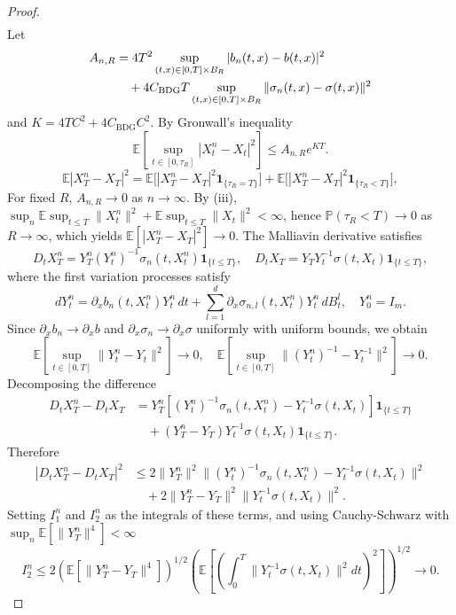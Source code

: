 \documentclass[10pt,a4paper]{amsart}
\begin{document}
\begin{proof}
\begin{align*}
\end{align*}
%
Let 
\begin{align}
A_{n,R} &= 4T^2 \sup_{(t,x) \in [0,T] \times B_R} |b_n(t, x) - b(t, x)|^2 \notag\\
&\quad + 4C_{\mathrm{BDG}}T \sup_{(t,x) \in [0,T] \times B_R} \|\sigma_n(t, x) - \sigma(t, x)\|^2
\end{align}
and $K = 4TC^2 + 4C_{\mathrm{BDG}}C^2$. By Gronwall's inequality
\[
\mathbb{E}\left[\sup_{t \in [0,\tau_R]} |X_t^n - X_t|^2\right] \leq A_{n,R} e^{KT}.
\]
\[
\mathbb{E}|X_T^n-X_T|^2 
= \mathbb{E}\big[|X_T^n-X_T|^2\mathbf{1}_{\{\tau_R=T\}}\big]
  + \mathbb{E}\big[|X_T^n-X_T|^2\mathbf{1}_{\{\tau_R<T\}}\big],
\]
For fixed \(R\), \(A_{n,R} \to 0\) as \(n \to \infty\). By (iii), \(\sup_n \mathbb{E}\sup_{t\le T}\|X_t^n\|^2 + \mathbb{E}\sup_{t\le T}\|X_t\|^2 < \infty\), hence \(\mathbb{P}(\tau_R<T)\to0\) as \(R\to\infty\), which yields \(\mathbb{E}[|X_T^n-X_T|^2]\to0\).
%
The Malliavin derivative satisfies
\[
D_t X_T^n = Y_T^n (Y_t^n)^{-1} \sigma_n(t, X_t^n) \mathbf{1}_{\{t \leq T\}}, \quad D_t X_T = Y_T Y_t^{-1} \sigma(t, X_t) \mathbf{1}_{\{t \leq T\}},
\]
where the first variation processes satisfy
\[
dY_t^n = \partial_x b_n(t, X_t^n) Y_t^n \, dt + \sum_{l=1}^d \partial_x \sigma_{n,l}(t, X_t^n) Y_t^n \, dB_t^l, \quad Y_0^n = I_m.
\]
%
Since \(\partial_x b_n \to \partial_x b\) and \(\partial_x \sigma_n \to \partial_x \sigma\) uniformly with uniform bounds, we obtain
\[
\mathbb{E}\left[\sup_{t \in [0,T]} \|Y_t^n - Y_t\|^2\right] \to 0, \quad \mathbb{E}\left[\sup_{t \in [0,T]} \|(Y_t^n)^{-1} - Y_t^{-1}\|^2\right] \to 0.
\]
%
Decomposing the difference
\begin{align*}
D_t X_T^n - D_t X_T &= Y_T^n [(Y_t^n)^{-1} \sigma_n(t, X_t^n) - Y_t^{-1} \sigma(t, X_t)] \mathbf{1}_{\{t \leq T\}} \\
&\quad + (Y_T^n - Y_T) Y_t^{-1} \sigma(t, X_t) \mathbf{1}_{\{t \leq T\}}.
\end{align*}
%
Therefore
\begin{align*}
|D_t X_T^n - D_t X_T|^2 &\leq 2\|Y_T^n\|^2 \|(Y_t^n)^{-1} \sigma_n(t, X_t^n) - Y_t^{-1} \sigma(t, X_t)\|^2 \\
&\quad + 2\|Y_T^n - Y_T\|^2 \|Y_t^{-1} \sigma(t, X_t)\|^2.
\end{align*}
%
Setting \(I_1^n\) and \(I_2^n\) as the integrals of these terms, and using Cauchy-Schwarz with \(\sup_n \mathbb{E}[\|Y_T^n\|^4] < \infty\)
\[
I_2^n \leq 2(\mathbb{E}[\|Y_T^n - Y_T\|^4])^{1/2} \left(\mathbb{E}\left[\left(\int_0^T \|Y_t^{-1} \sigma(t, X_t)\|^2 dt\right)^2\right]\right)^{1/2} \to 0.
\]
\end{proof}
\end{document}
